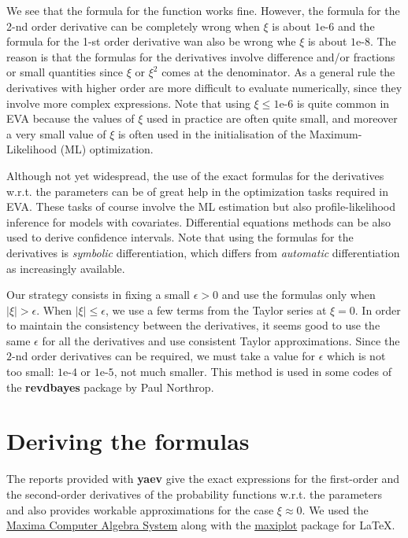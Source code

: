 \documentclass[11pt]{article}\usepackage[]{graphicx}\usepackage[]{xcolor}
\begin{document}
\noindent
We see that the formula for the function works fine. However, the
formula for the 2-nd order derivative can be completely wrong when
$\xi$ is about $\text{1e-6}$ and the formula for the 1-st order
derivative wan also be wrong whe $\xi$ is about $\text{1e-8}$. The
reason is that the formulas for the derivatives involve difference
and/or fractions or small quantities since $\xi$ or $\xi^2$ comes at
the denominator. As a general rule the derivatives with higher order
are more difficult to evaluate numerically, since they involve more
complex expressions.  Note that using $\xi \leqslant \text{1e-6}$ is
quite common in EVA because the values of $\xi$ used in practice are
often quite small, and moreover a very small value of $\xi$ is often
used in the initialisation of the Maximum-Likelihood (ML)
optimization.

Although not yet widespread, the use of the exact formulas for the
derivatives w.r.t. the parameters can be of great help in the
optimization tasks required in EVA. These tasks of course involve the
ML estimation but also profile-likelihood inference for models with
covariates. Differential equations methods can be also used to derive
confidence intervals. Note that using the formulas for the derivatives
is \textit{symbolic} differentiation, which differs from
\textit{automatic} differentiation as increasingly available.

Our strategy consists in fixing a small $\epsilon >0$ and use the
formulas only when $|\xi| > \epsilon$. When
$|\xi| \leqslant \epsilon$, we use a few terms from the Taylor series
at $\xi =0$. In order to maintain the consistency between the
derivatives, it seems good to use the same $\epsilon$ for all the
derivatives and use consistent Taylor approximations. Since the $2$-nd
order derivatives can be required, we must take a value for $\epsilon$
which is not too small: $\text{1e-4}$ or $\text{1e-5}$, not much
smaller. This method is used in some codes of the \textbf{revdbayes} package
by Paul Northrop.

\section{Deriving the formulas}

The reports provided with \textbf{yaev} give the exact expressions for
the first-order and the second-order derivatives of the probability
functions w.r.t. the parameters and also provides workable
approximations for the case $\xi \approx 0$. We used the
\href{https://maxima.sourceforge.io/}{Maxima Computer Algebra System}
along with the
\href{https://maxima.sourceforge.io/contrib/maxiplot/maxiplot.sty}{maxiplot}
package for \LaTeX{}.
\end{document}

